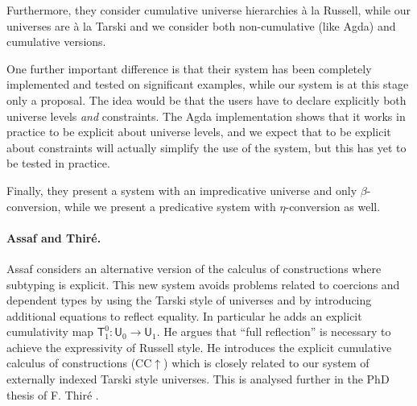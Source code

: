 \documentclass[11pt,a4paper]{article}
\theoremstyle{definition}
\newcommand{\UU}{\mathsf{U}}
\newcommand{\Type}{\mathsf{Type}}
\newcommand{\T}{\mathsf{T}}
\begin{document}
Furthermore, they consider cumulative universe hierarchies  \`a la Russell, while
our universes are \`a la Tarski and we consider both non-cumulative (like Agda) and cumulative versions.

%
One further important difference is that their system has been completely implemented and tested on
significant examples, while our system is at this stage only a proposal. The idea would be that the
users have to declare explicitly both universe levels {\em and} constraints. The Agda implementation
shows that it works in practice to be explicit about universe levels, and we expect that to be
explicit about constraints will actually simplify the use of the system, but this has yet to be tested in
practice.

Finally, they present a system with an impredicative universe and only $\beta$-conversion, while we present a predicative
system with $\eta$-conversion as well.

\paragraph{Assaf and Thir\'e.}

Assaf \cite{Assaf14} considers an alternative version of the calculus of
constructions where subtyping is explicit. This new system avoids problems related to coercions and dependent types by using the Tarski style
of universes and by introducing additional equations to reflect equality. In particular he adds an explicit cumulativity map $\T^0_1 : \UU_0 \to \UU_1$. He argues that ``full reflection'' is necessary to achieve the expressivity of Russell style. He introduces the explicit cumulative calculus of constructions (CC$\uparrow$) which is closely related to our system of externally indexed Tarski style universes.
This is analysed further in the PhD thesis of F. Thir\'e \cite{Thire20}.
\end{document}
